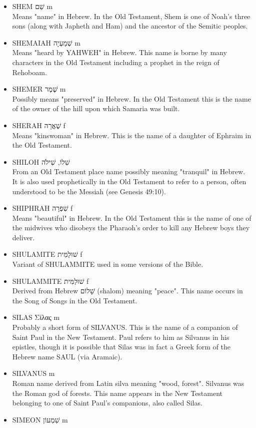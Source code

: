 \begin{itemize}
\item SHEM שֵׁם m \\
Means "name" in Hebrew. In the Old Testament, Shem is one of Noah's three sons (along with Japheth and Ham) and the ancestor of the Semitic peoples.
\item SHEMAIAH שְׁמַעְיָה m \\
Means "heard by YAHWEH" in Hebrew. This name is borne by many characters in the Old Testament including a prophet in the reign of Rehoboam.
\item SHEMER שֶׁמֶר m \\
Possibly means "preserved" in Hebrew. In the Old Testament this is the name of the owner of the hill upon which Samaria was built.
\item SHERAH שֶׁאֱרָה f \\
Means "kinswoman" in Hebrew. This is the name of a daughter of Ephraim in the Old Testament.
\item SHILOH שִׁלוֹ, שִׁילֹה \\
From an Old Testament place name possibly meaning "tranquil" in Hebrew. It is also used prophetically in the Old Testament to refer to a person, often understood to be the Messiah (see Genesis 49:10). 
\item SHIPHRAH שִׁפְרָה f \\
Means "beautiful" in Hebrew. In the Old Testament this is the name of one of the midwives who disobeys the Pharaoh's order to kill any Hebrew boys they deliver.
\item SHULAMITE שׁוּלַמִּית f \\
Variant of SHULAMMITE used in some versions of the Bible.
\item SHULAMMITE שׁוּלַמִּית f \\
Derived from Hebrew שָׁלוֹם (shalom) meaning "peace". This name occurs in the Song of Songs in the Old Testament.
\item SILAS Σίλας m \\
Probably a short form of SILVANUS. This is the name of a companion of Saint Paul in the New Testament. Paul refers to him as Silvanus in his epistles, though it is possible that Silas was in fact a Greek form of the Hebrew name SAUL (via Aramaic).
\item SILVANUS m \\
Roman name derived from Latin silva meaning "wood, forest". Silvanus was the Roman god of forests. This name appears in the New Testament belonging to one of Saint Paul's companions, also called Silas.
\item SIMEON שִׁמְעוֹן m \\

\end{itemize}
